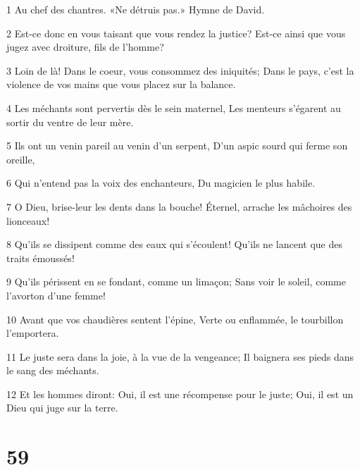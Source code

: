 \par 1 Au chef des chantres. «Ne détruis pas.» Hymne de David.
\par 2 Est-ce donc en vous taisant que vous rendez la justice? Est-ce ainsi que vous jugez avec droiture, fils de l'homme?
\par 3 Loin de là! Dans le coeur, vous consommez des iniquités; Dans le pays, c'est la violence de vos mains que vous placez sur la balance.
\par 4 Les méchants sont pervertis dès le sein maternel, Les menteurs s'égarent au sortir du ventre de leur mère.
\par 5 Ils ont un venin pareil au venin d'un serpent, D'un aspic sourd qui ferme son oreille,
\par 6 Qui n'entend pas la voix des enchanteurs, Du magicien le plus habile.
\par 7 O Dieu, brise-leur les dents dans la bouche! Éternel, arrache les mâchoires des lionceaux!
\par 8 Qu'ils se dissipent comme des eaux qui s'écoulent! Qu'ils ne lancent que des traits émoussés!
\par 9 Qu'ils périssent en se fondant, comme un limaçon; Sans voir le soleil, comme l'avorton d'une femme!
\par 10 Avant que vos chaudières sentent l'épine, Verte ou enflammée, le tourbillon l'emportera.
\par 11 Le juste sera dans la joie, à la vue de la vengeance; Il baignera ses pieds dans le sang des méchants.
\par 12 Et les hommes diront: Oui, il est une récompense pour le juste; Oui, il est un Dieu qui juge sur la terre.

\chapter{59}

